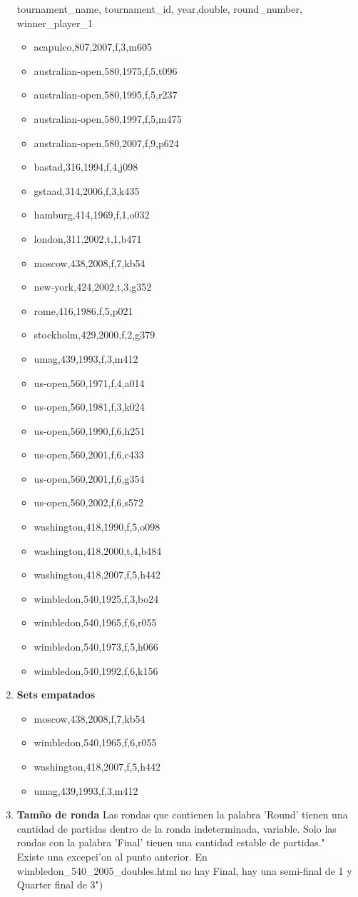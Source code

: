 \documentclass[a4paper,10pt]{article}
\begin{document}
\begin{enumerate}
tournament\_name, tournament\_id, year,double, round\_number, winner\_player\_1
\begin{itemize}
 \item acapulco,807,2007,f,3,m605
 \item australian-open,580,1975,f,5,t096
 \item australian-open,580,1995,f,5,r237
 \item australian-open,580,1997,f,5,m475
 \item australian-open,580,2007,f,9,p624
 \item bastad,316,1994,f,4,j098
 \item gstaad,314,2006,f,3,k435
 \item hamburg,414,1969,f,1,o032
 \item london,311,2002,t,1,b471
 \item moscow,438,2008,f,7,kb54
 \item new-york,424,2002,t,3,g352
 \item rome,416,1986,f,5,p021
 \item stockholm,429,2000,f,2,g379
 \item umag,439,1993,f,3,m412
 \item us-open,560,1971,f,4,a014
 \item us-open,560,1981,f,3,k024
 \item us-open,560,1990,f,6,h251
 \item us-open,560,2001,f,6,c433
 \item us-open,560,2001,f,6,g354
 \item us-open,560,2002,f,6,s572
 \item washington,418,1990,f,5,o098
 \item washington,418,2000,t,4,b484
 \item washington,418,2007,f,5,h442
 \item wimbledon,540,1925,f,3,bo24
 \item wimbledon,540,1965,f,6,r055
 \item wimbledon,540,1973,f,5,h066
 \item wimbledon,540,1992,f,6,k156
\end{itemize}


\item \textbf{Sets empatados}
\begin{itemize}
 \item moscow,438,2008,f,7,kb54
 \item wimbledon,540,1965,f,6,r055
 \item washington,418,2007,f,5,h442
 \item umag,439,1993,f,3,m412
\end{itemize}

\item \textbf{Tam\~no de ronda} Las rondas que contienen la palabra 'Round' tienen una cantidad de partidas dentro de la ronda indeterminada, variable. Solo las rondas con la palabra 'Final' tienen una cantidad estable de partidas."
\\
Existe una excepci'on al punto anterior. En wimbledon\_540\_2005\_doubles.html no hay Final, hay una semi-final de 1 y Quarter final de 3")

\end{enumerate}
\end{document}
